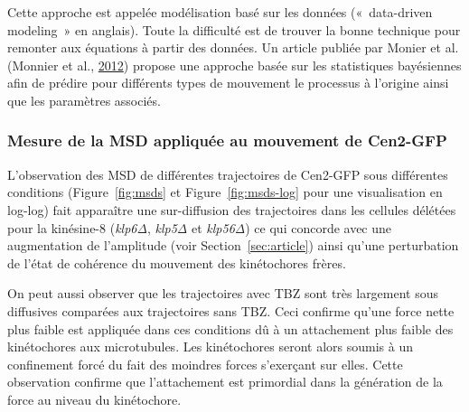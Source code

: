 \documentclass[12pt,a4paper,twoside,openright]{book}
\begin{document}
Cette approche est appelée modélisation basé sur les données
(«~data-driven modeling~» en anglais). Toute la difficulté est de
trouver la bonne technique pour remonter aux équations à partir des
données. Un article publiée par Monier et al. (Monnier et al.,
\protect\hyperlink{ref-Monnier2012}{2012}) propose une approche basée
sur les statistiques bayésiennes afin de prédire pour différents types
de mouvement le processus à l'origine ainsi que les paramètres associés.

\subsubsection{Mesure de la MSD appliquée au mouvement de
Cen2-GFP}\label{mesure-de-la-msd-appliquuxe9e-au-mouvement-de-cen2-gfp}

L'observation des MSD de différentes trajectoires de Cen2-GFP sous
différentes conditions (Figure~\ref{fig:msds} et
Figure~\ref{fig:msds-log} pour une visualisation en log-log) fait
apparaître une sur-diffusion des trajectoires dans les cellules délétées
pour la kinésine-8 (\emph{klp6Δ}, \emph{klp5Δ} et \emph{klp56Δ}) ce qui
concorde avec une augmentation de l'amplitude (voir
Section~\ref{sec:article}) ainsi qu'une perturbation de l'état de
cohérence du mouvement des kinétochores frères.

On peut aussi observer que les trajectoires avec TBZ sont très largement
sous diffusives comparées aux trajectoires sans TBZ. Ceci confirme
qu'une force nette plus faible est appliquée dans ces conditions dû à un
attachement plus faible des kinétochores aux microtubules. Les
kinétochores seront alors soumis à un confinement forcé du fait des
moindres forces s'exerçant sur elles. Cette observation confirme que
l'attachement est primordial dans la génération de la force au niveau du
kinétochore.
\end{document}
